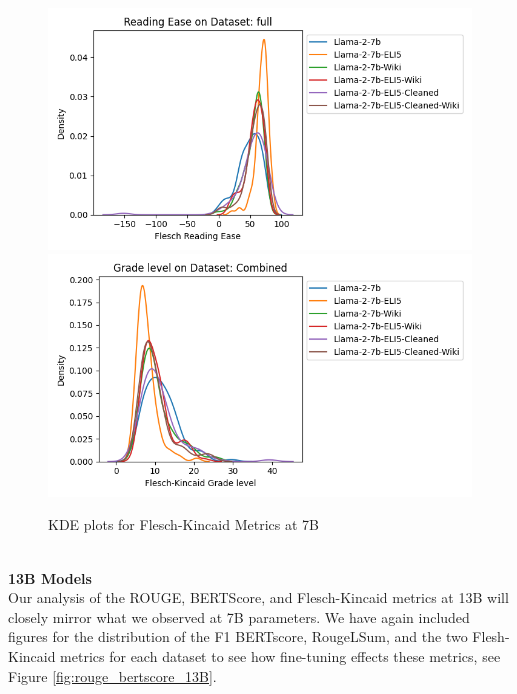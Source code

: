 \documentclass[11pt, oneside]{article}   	%
\begin{document}
\begin{figure}
\\
\includegraphics[scale=.5]{./figures/FRE_7B_full.png}
\includegraphics[scale=.5]{./figures/FKG_7B_full.png}
\caption{KDE plots for Flesch-Kincaid Metrics at 7B}
\label{fig:KDE_FKG_7B}
\end{figure}
\
\\[10pt]
\noindent\textbf{13B Models}
\\[10pt]
Our analysis of the ROUGE, BERTScore, and Flesch-Kincaid metrics at 13B will closely mirror what we observed at 7B parameters.
We have again included figures for the distribution of the F1 BERTscore, RougeLSum, and the two Flesh-Kincaid metrics for each dataset to see how fine-tuning effects these metrics, see Figure \ref{fig:rouge_bertscore_13B}.
\end{document}
